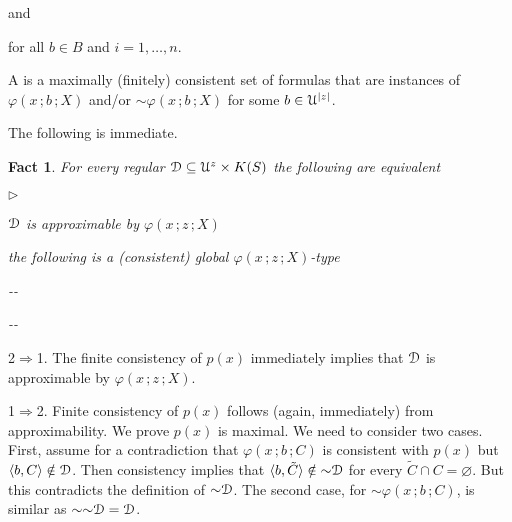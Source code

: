 \documentclass{amsproc}
\makeatletter
\newcommand{\mylabel}[1]{{#1}\hfill}
\renewenvironment{itemize}
  {\begin{list}{$\triangleright$}{%
  \setlength{\parskip}{0mm}
  \setlength{\topsep}{.1\baselineskip}
  \setlength{\rightmargin}{0mm}
  \setlength{\listparindent}{0mm}
  \setlength{\itemindent}{0mm}
  \setlength{\labelwidth}{3ex}
  \setlength{\itemsep}{.1\baselineskip}
  \setlength{\parsep}{.1\baselineskip}
  \setlength{\partopsep}{0mm}
  \setlength{\labelsep}{1ex}
  \setlength{\leftmargin}{\labelwidth+\labelsep}
  \let\makelabel\mylabel}}{%
\end{list}}
\newcounter{thm}
\theoremstyle{mio}
\newtheorem{fact}[thm]{Fact}\tcolorboxenvironment{fact}{mythm}
\providecommand{\proofNameStyle}{\bfseries}
\renewenvironment{proof}[1][\proofname]{\par
  \pushQED{\qed}%
  \normalfont%
  \trivlist
  \item[\hskip\labelsep
        \proofNameStyle
    #1\@addpunct{.}]\ignorespaces
}{%
  \popQED\endtrivlist\@endpefalse
}
\renewcommand*{\emph}[1]{%
   \smash{\tikz[baseline]\node[rectangle, fill=teal!25, rounded corners, inner xsep=0.5ex, inner ysep=0.2ex, anchor=base, minimum height = 2.7ex]{\strut #1};}}
\makeatother
\begin{document}
\quad and

\hfill for all $b\in B$ and $i=1,\dots,n$.

A \emph{global $\varphi(x\,;z\,;X)$-type\/} is a maximally (finitely) consistent set of formulas that are instances of $\varphi(x\,;b\,;X)$ and/or ${\sim}\varphi(x\,;b\,;X)$ for some $b\in{\EuScript U}^{|z|}$.

The following is immediate.

\begin{fact}
  For every regular ${\EuScript D}\subseteq {\EuScript U}^z\times K(S)$ the following are equivalent
  \begin{itemize}
    \item [1.] ${\EuScript D}$ is approximable by $\varphi(x\,;z\,;X)$
    \item [2.] the following is a (consistent) global $\varphi(x\,;z\,;X)$-type\smallskip
    
    \noindent\kern-\kern-
    \smallskip

    \noindent\kern-\kern-
  
  \end{itemize}
\end{fact}

\begin{proof}
  2$\Rightarrow$1.
  The finite consistency of $p(x)$ immediately implies that ${\EuScript D}$ is approximable by $\varphi(x\,;z\,;X)$.

  1$\Rightarrow$2.
  Finite consistency of $p(x)$ follows (again, immediately) from approximability.
  We prove $p(x)$ is maximal.
  We need to consider two cases.
  First, assume for a contradiction that $\varphi(x\,;b\,;C)$ is consistent with $p(x)$ but $\langle b,C\rangle\notin{\EuScript D}$.
  Then consistency implies that $\langle b,\tilde C\rangle\notin{\sim}{\EuScript D}$ for every $\tilde C\cap C=\varnothing$.
  But this contradicts the definition of ${\sim}{\EuScript D}$.
  The second case, for ${\sim}\varphi(x\,;b\,;C)$, is similar as ${\sim}{\sim}{\EuScript D}={\EuScript D}$.
\end{proof}
\end{document}
